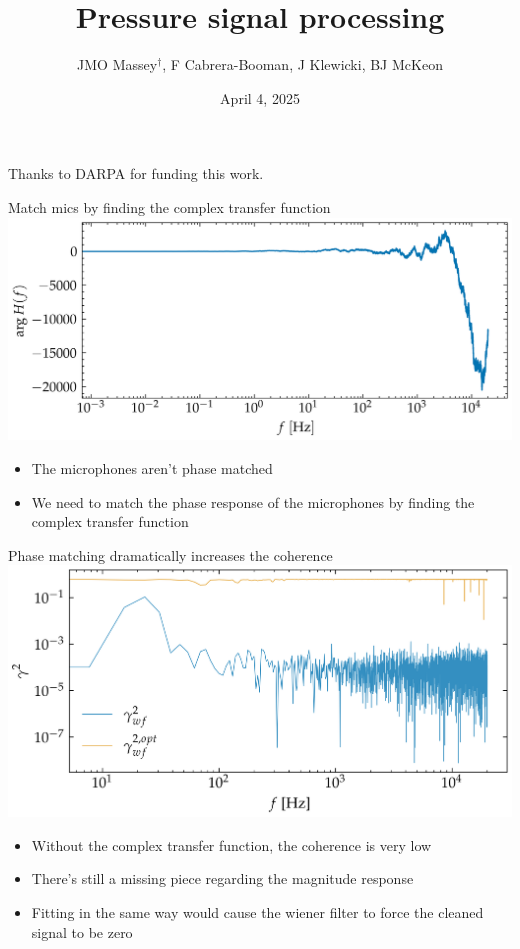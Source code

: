 \documentclass[aspectratio=169]{beamer}
\title{Pressure signal processing}
\author{JMO Massey$^{\dag}$, F Cabrera-Booman, J Klewicki, BJ McKeon}
\institute{Center for Turbulence Research \\ Stanford University}
\date{April 4, 2025}
\begin{document}
\begin{frame}
    \setcounter{framenumber}{0}
    \titlepage
    \vfill
    {\scriptsize \centering Thanks to DARPA for funding this work.\par}
\end{frame}

\begin{frame}{Match mics by finding the complex transfer function}
    \centering
    \includegraphics[width=0.7\linewidth]{figures/complex_transfer_function.png}
    \begin{itemize}
            \centering
        \item The microphones aren't phase matched
        \item We need to match the phase response of the microphones by finding the complex transfer function
    \end{itemize}
\end{frame}

\begin{frame}{Phase matching dramatically increases the coherence}
    \centering
    \includegraphics[width=0.7\linewidth]{figures/coherence.png}
    \begin{itemize}
        \centering
        \item Without the complex transfer function, the coherence is very low
        \item There's still a missing piece regarding the magnitude response
        \item Fitting in the same way would cause the wiener filter to force the cleaned signal to be zero
    \end{itemize}
\end{frame}
\end{document}
